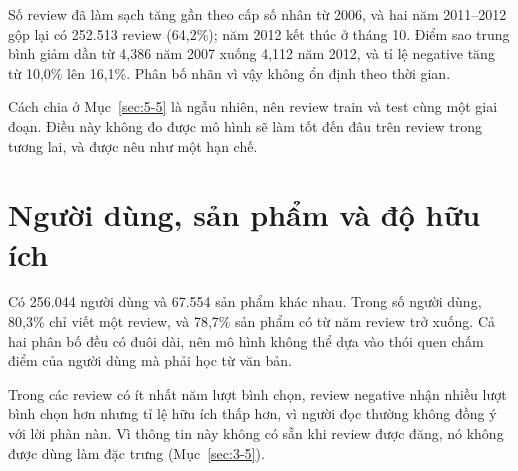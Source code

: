 \begin{center}
\end{center}

Số review đã làm sạch tăng gần theo cấp số nhân từ 2006, và hai năm 2011--2012 gộp lại có 252.513 review (64,2\%); năm 2012 kết thúc ở tháng 10. Điểm sao trung bình giảm dần từ 4,386 năm 2007 xuống 4,112 năm 2012, và tỉ lệ negative tăng từ 10,0\% lên 16,1\%. Phân bố nhãn vì vậy không ổn định theo thời gian.

Cách chia ở Mục~\ref{sec:5-5} là ngẫu nhiên, nên review train và test cùng một giai đoạn. Điều này không đo được mô hình sẽ làm tốt đến đâu trên review trong tương lai, và được nêu như một hạn chế.

\section{Người dùng, sản phẩm và độ hữu ích}
\label{sec:4-6}

Có 256.044 người dùng và 67.554 sản phẩm khác nhau. Trong số người dùng, 80,3\% chỉ viết một review, và 78,7\% sản phẩm có từ năm review trở xuống. Cả hai phân bố đều có đuôi dài, nên mô hình không thể dựa vào thói quen chấm điểm của người dùng mà phải học từ văn bản.

Trong các review có ít nhất năm lượt bình chọn, review negative nhận nhiều lượt bình chọn hơn nhưng tỉ lệ hữu ích thấp hơn, vì người đọc thường không đồng ý với lời phàn nàn. Vì thông tin này không có sẵn khi review được đăng, nó không được dùng làm đặc trưng (Mục~\ref{sec:3-5}).

